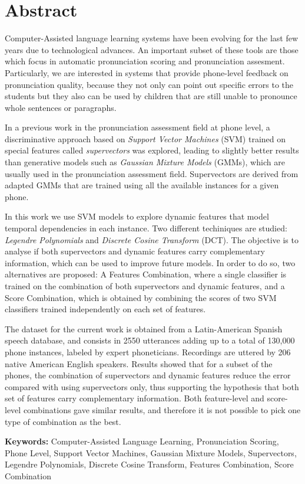 \chapter*{Abstract}

\noindent
Computer-Assisted language learning systems have been evolving for the last few years due to
technological advances. An important subset of these tools are those which focus in
automatic pronunciation scoring and pronunciation assesment. Particularly, we
are interested in systems that provide phone-level feedback on pronunciation quality,
because they not only can point out specific errors to the students but they also
can be used by children that are still unable to pronounce whole sentences or paragraphs.

In a previous work in the pronunciation assessment field at phone level, a discriminative
approach based on \textit{Support Vector Machines} (SVM) trained on special features
called \textit{supervectors} was explored, leading to slightly better results than
generative models such as \textit{Gaussian Mixture Models} (GMMs), which are usually
used in the pronunciation assessment field. Supervectors are derived from
adapted GMMs that are trained using all the available instances for a given phone.

In this work we use SVM models to explore dynamic features that model
temporal dependencies in each instance. Two different techiniques are studied:
\textit{Legendre Polynomials} and \textit{Discrete Cosine Transform} (DCT).
The objective is to analyse if both supervectors and dynamic features carry
complementary information, which can be used to improve future models. In order to do
so, two alternatives are proposed: A Features Combination, where a single classifier
is trained on the combination of both supervectors and dynamic features, and a
Score Combination, which is obtained by combining the scores of two SVM classifiers
trained independently on each set of features.

The dataset for the current work is obtained from a Latin-American Spanish speech database,
and consists in 2550 utterances adding up to a total of 130,000 phone instances, labeled
by expert phoneticians. Recordings are uttered by 206 native American English speakers.
Results showed that for a subset of the phones, the combination of supervectors and
dynamic features reduce the error compared with using supervectors only, thus supporting
the hypothesis that both set of features carry complementary information. Both feature-level
and score-level combinations gave similar results, and therefore it is not possible
to pick one type of combination as the best.

\bigskip

\noindent\textbf{Keywords:} Computer-Assisted Language Learning, Pronunciation Scoring, Phone Level, Support Vector Machines, Gaussian Mixture Models, Supervectors, Legendre Polynomials, Discrete Cosine Transform, Features Combination, Score Combination



